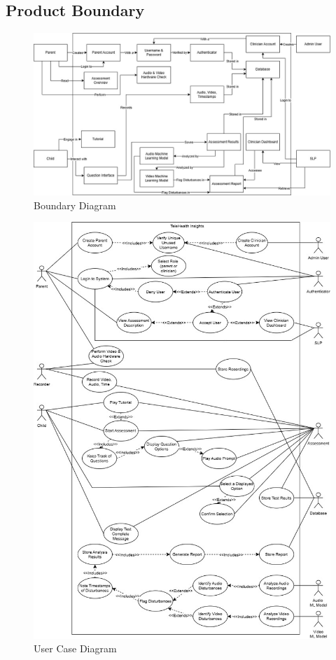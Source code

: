 \documentclass[12pt]{article}
\begin{document}
\subsection{Product Boundary}
\begin{figure}[H]
  \centering
  \includegraphics[scale=0.45]{images/BoundaryDiagram.jpg}
  \caption{Boundary Diagram}
\end{figure}
\begin{figure}[H]
  \centering
  \includegraphics[scale=0.5]{images/UseCaseDiagram.jpg}
  \caption{User Case Diagram}
\end{figure}
\end{document}
